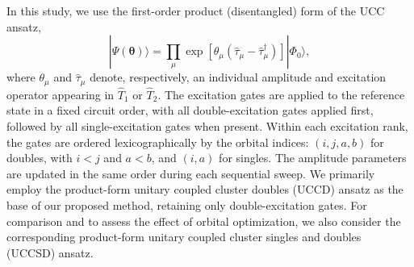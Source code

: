 \documentclass[
 reprint,
 amsmath,amssymb,
 aps,
 physrev,
]{revtex4-2}
\begin{document}
In this study, we use the first-order product (disentangled) form of the UCC ansatz,
\begin{equation}
    \label{eq:product_ucc}
    |\Psi(\bm{\theta})\rangle
    =
    \prod_{\mu}%
    \exp\!\left[\theta_{\mu}\left(\hat{\tau}_{\mu}-\hat{\tau}_{\mu}^{\dagger}\right)\right]
    |\Phi_0\rangle,
\end{equation}
where \( \theta_{\mu} \) and \( \hat{\tau}_{\mu} \) denote, respectively, an individual amplitude and excitation operator appearing in \( \hat{T}_1 \) or \( \hat{T}_2 \).
\color{black}
The excitation gates are applied to the reference state in a fixed circuit order, with all double-excitation gates applied first, followed by all single-excitation gates when present. Within each excitation rank, the gates are ordered lexicographically by the orbital indices: \((i, j, a, b)\) for doubles, with \(i < j\) and \(a < b\), and \((i, a)\) for singles. The amplitude parameters are updated in the same order during each sequential sweep.
\color{black}
We primarily employ the product-form unitary coupled cluster doubles (UCCD) ansatz as the base of our proposed method, retaining only double-excitation gates. For comparison and to assess the effect of orbital optimization, we also consider the corresponding product-form unitary coupled cluster singles and doubles (UCCSD) ansatz.
%
\end{document}
